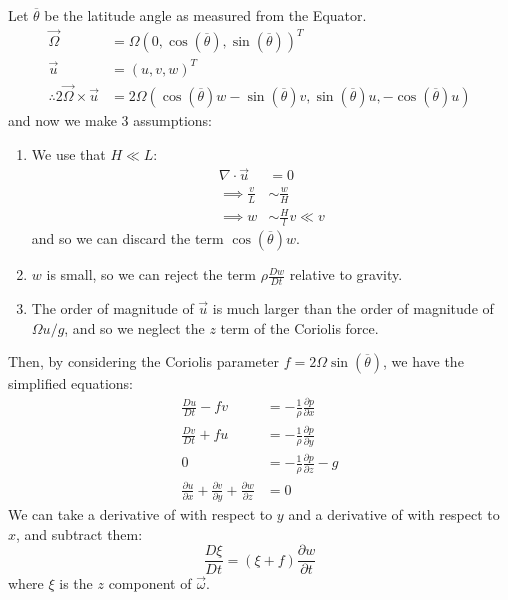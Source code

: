 \documentclass[../Main.tex]{subfiles}
\begin{document}
Let $\overline{\theta}$ be the latitude angle as measured from the Equator.
\begin{align*}
    \vec{\Omega} &= \Omega \left(0, \cos(\overline{\theta}), \sin(\overline{\theta})\right)^T \\
    \vec{u} &= (u,v, w)^T \\
    \therefore 2 \vec{\Omega} \times \vec{u} &= 2\Omega \left(\cos(\overline{\theta})w - \sin(\overline{\theta})v, \sin(\overline{\theta})u, -\cos(\overline{\theta}) u\right)
\end{align*}
and now we make 3 assumptions:
\begin{enumerate}
    \item We use that $H \ll L$:
        \begin{align*}
            \nabla \cdot \vec{u} &= 0 \\
            \implies \frac{v}{L} &\sim \frac{w}{H} \\
            \implies w &\sim \frac{H}{l} v \ll v
        \end{align*}
        and so we can discard the term $\cos(\overline{\theta})w$.
    \item $w$ is small, so we can reject the term $\rho \frac{D w}{D t}$ relative to gravity.
    \item The order of magnitude of $\vec{u}$ is much larger than the order of magnitude of $\Omega u / g$, and so we neglect the $z$ term of the Coriolis force.
\end{enumerate}
Then, by considering the Coriolis parameter $f = 2\Omega \sin(\overline{\theta})$, we have the simplified equations:
\begin{align}
    \frac{D u}{D t} - fv &= -\frac1\rho \frac{\partial p}{\partial x} \label{eqnRotX} \\
    \frac{D v}{D t} + fu &= -\frac1\rho \frac{\partial p}{\partial y} \label{eqnRotY} \\
    0 &= -\frac1\rho\frac{\partial p}{\partial z} - g \label{eqnRotZ} \\
    \frac{\partial u}{\partial x} + \frac{\partial v}{\partial y} + \frac{\partial w}{\partial z} &= 0 \label{eqnRotNoDiv}
\end{align}
We can take a derivative of  with respect to $y$ and a derivative of  with respect to $x$, and subtract them:
\begin{equation*}
    \frac{D \xi}{D t} = (\xi + f) \frac{\partial w}{\partial t}
\end{equation*}
where $\xi$ is the $z$ component of $\vec{\omega}$.
\end{document}

